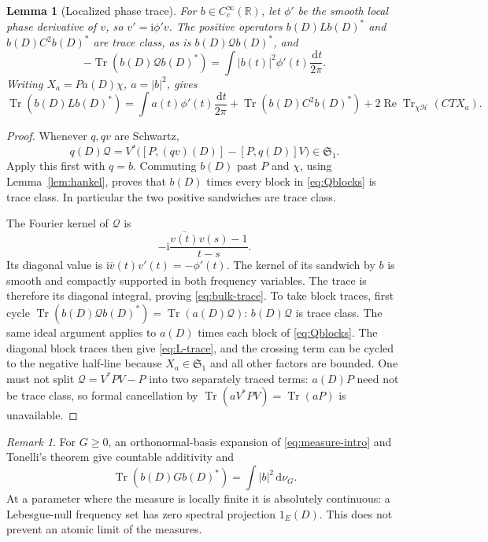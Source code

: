 \documentclass[11pt]{article}
\numberwithin{equation}{section}
\newtheorem{lemma}[theorem]{Lemma}
\theoremstyle{definition}
\theoremstyle{remark}
\newtheorem{remark}[theorem]{Remark}
\newcommand{\HH}{\mathcal H}
\newcommand{\Tr}{\operatorname{Tr}}
\newcommand{\Rea}{\operatorname{Re}}
\newcommand{\ii}{\mathrm i}
\newcommand{\Qcal}{\mathcal Q}
\newcommand{\Sone}{\mathfrak S_1}
\newcommand{\dd}{\,\mathrm d}
\begin{document}
\begin{lemma}[Localized phase trace]\label{lem:phase-trace}
For \(b\in C_c^\infty(\mathbb R)\), let \(\phi'\) be the smooth
local phase derivative of \(v\), so \(v'=\ii\phi'v\).
The positive operators \(b(D)Lb(D)^*\) and \(b(D)C^2b(D)^*\)
are trace class, as is \(b(D)\Qcal b(D)^*\), and
\begin{equation}\label{eq:bulk-trace}
-\Tr(b(D)\Qcal b(D)^*)=\int |b(t)|^2\phi'(t)\frac{\dd t}{2\pi}.
\end{equation}
Writing \(X_a=Pa(D)\chi\), \(a=|b|^2\), gives
\begin{equation}\label{eq:L-trace}
\Tr(b(D)Lb(D)^*)=
\int a(t)\phi'(t)\frac{\dd t}{2\pi}
+\Tr(b(D)C^2b(D)^*)+2\Rea\Tr_{\chi\HH}(CTX_a).
\end{equation}
\end{lemma}
\begin{proof}
Whenever \(q,qv\) are Schwartz,
\begin{equation}\label{eq:phase-comm}
q(D)\Qcal
=V^*\bigl([P,(qv)(D)]-[P,q(D)]V\bigr)\in\Sone.
\end{equation}
Apply this first with \(q=b\). Commuting \(b(D)\) past \(P\)
and \(\chi\), using Lemma~\ref{lem:hankel}, proves that \(b(D)\)
times every block in \eqref{eq:Qblocks} is trace class. In particular
the two positive sandwiches are trace class.

The Fourier kernel of \(\Qcal\) is
\[
-\ii\frac{\overline{v(t)}v(s)-1}{t-s}.
\]
Its diagonal value is \(\ii\overline v(t)v'(t)=-\phi'(t)\).
The kernel of its sandwich by \(b\) is smooth and compactly supported
in both frequency variables. The trace is therefore its diagonal
integral, proving \eqref{eq:bulk-trace}.
To take block traces, first cycle
\(\Tr(b(D)\Qcal b(D)^*)=\Tr(a(D)\Qcal)\):
\(b(D)\Qcal\) is trace class. The same ideal argument applies to
\(a(D)\) times each block of \eqref{eq:Qblocks}. The diagonal block
traces then give \eqref{eq:L-trace}, and the crossing term can be cycled
to the negative half-line because \(X_a\in\Sone\) and all other
factors are bounded. One must not split \(\Qcal=V^*PV-P\) into
two separately traced terms: \(a(D)P\) need not be trace class, so
formal cancellation by \(\Tr(aV^*PV)=\Tr(aP)\) is unavailable.
\end{proof}

\begin{remark}
For \(G\ge0\), an orthonormal-basis expansion of
\eqref{eq:measure-intro} and Tonelli's theorem give countable additivity
and
\[
\Tr(b(D)Gb(D)^*)=\int|b|^2\dd\nu_G.
\]
At a parameter where the measure is locally finite it is absolutely
continuous: a Lebesgue-null frequency set has zero spectral projection
\(1_E(D)\). This does not prevent an atomic limit of the measures.
\end{remark}
\end{document}
